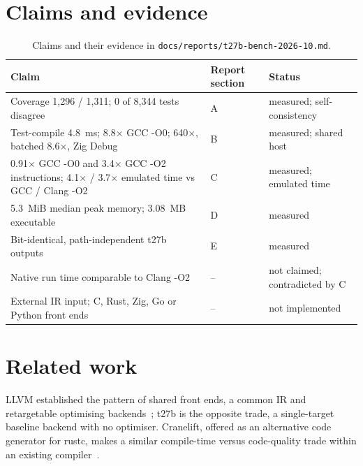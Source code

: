 \documentclass[11pt,a4paper]{article}
\begin{document}
\section{Claims and evidence}

\begin{table}[h]
\centering
\small
\begin{tabularx}{\linewidth}{@{}YlY@{}}
\toprule
Claim & Report section & Status \\
\midrule
Coverage 1,296 / 1,311; 0 of 8,344 tests disagree & A & measured; self-consistency \\
Test-compile 4.8~ms; 8.8$\times$ GCC -O0; 640$\times$, batched 8.6$\times$, Zig Debug & B & measured; shared host \\
0.91$\times$ GCC -O0 and 3.4$\times$ GCC -O2 instructions; 4.1$\times$ / 3.7$\times$ emulated time vs GCC / Clang -O2 & C & measured; emulated time \\
5.3~MiB median peak memory; 3.08~MB executable & D & measured \\
Bit-identical, path-independent t27b outputs & E & measured \\
Native run time comparable to Clang -O2 & -- & not claimed; contradicted by C \\
External IR input; C, Rust, Zig, Go or Python front ends & -- & not implemented \\
\bottomrule
\end{tabularx}
\caption{Claims and their evidence in \texttt{docs/reports/t27b-bench-2026-10.md}.}
\label{tab:claims}
\end{table}

\section{Related work}

LLVM established the pattern of shared front ends, a common IR and
retargetable optimising backends~\cite{lattner2004}; t27b is the opposite
trade, a single-target baseline backend with no optimiser. Cranelift,
offered as an alternative code generator for rustc, makes a similar
compile-time versus code-quality trade within an existing
compiler~\cite{rustcCodegenSsa,craneliftTradeoff}.
\end{document}
